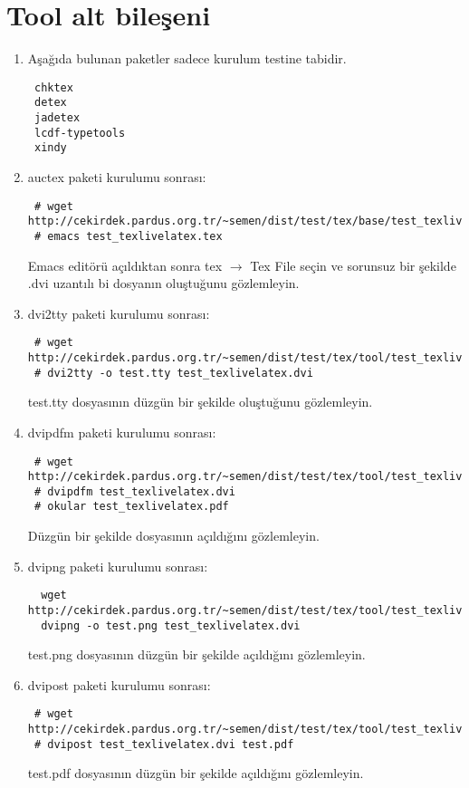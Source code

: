 \documentclass[a4paper,10pt]{article}
\begin{document}
\section{Tool alt bileşeni}
\begin{enumerate}
 \item Aşağıda bulunan paketler sadece kurulum testine tabidir.
\begin{verbatim}
 chktex
 detex
 jadetex
 lcdf-typetools
 xindy
\end{verbatim}

 \item auctex paketi kurulumu sonrası:
  
\begin{verbatim}
 # wget http://cekirdek.pardus.org.tr/~semen/dist/test/tex/base/test_texlivelatex.tex
 # emacs test_texlivelatex.tex 
\end{verbatim}

Emacs editörü açıldıktan sonra tex $\rightarrow$ Tex File seçin ve sorunsuz bir şekilde .dvi uzantılı bi dosyanın oluştuğunu gözlemleyin.

 \item dvi2tty paketi kurulumu sonrası:
  
\begin{verbatim}
 # wget http://cekirdek.pardus.org.tr/~semen/dist/test/tex/tool/test_texlivelatex.dvi
 # dvi2tty -o test.tty test_texlivelatex.dvi
\end{verbatim}

test.tty dosyasının düzgün bir şekilde oluştuğunu gözlemleyin.
\item dvipdfm paketi kurulumu sonrası:
  
\begin{verbatim}
 # wget http://cekirdek.pardus.org.tr/~semen/dist/test/tex/tool/test_texlivelatex.dvi
 # dvipdfm test_texlivelatex.dvi
 # okular test_texlivelatex.pdf
\end{verbatim}

 Düzgün bir şekilde dosyasının açıldığını gözlemleyin.
\item dvipng paketi kurulumu sonrası:
 \begin{verbatim}
  wget http://cekirdek.pardus.org.tr/~semen/dist/test/tex/tool/test_texlivelatex.dvi
  dvipng -o test.png test_texlivelatex.dvi
 \end{verbatim}

 test.png dosyasının düzgün bir şekilde açıldığını gözlemleyin.
\item dvipost paketi kurulumu sonrası:
  \begin{verbatim}
 # wget http://cekirdek.pardus.org.tr/~semen/dist/test/tex/tool/test_texlivelatex.dvi
 # dvipost test_texlivelatex.dvi test.pdf
 \end{verbatim}
 test.pdf dosyasının düzgün bir şekilde açıldığını gözlemleyin.


\end{enumerate}
\end{document}
